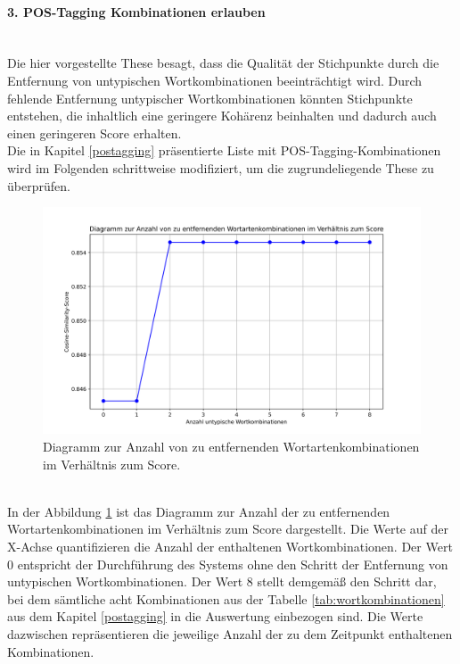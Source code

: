 \paragraph{3. POS-Tagging Kombinationen erlauben}\mbox{}\\
Die hier vorgestellte These besagt, dass die Qualität der Stichpunkte durch die Entfernung von untypischen Wortkombinationen beeinträchtigt wird. Durch fehlende Entfernung untypischer Wortkombinationen könnten Stichpunkte entstehen, die inhaltlich eine geringere Kohärenz beinhalten und dadurch auch einen geringeren Score erhalten.\\

Die in Kapitel \ref{postagging} präsentierte Liste mit POS-Tagging-Kombinationen wird im Folgenden schrittweise modifiziert, um die zugrundeliegende These zu überprüfen.
\begin{figure}[H]
	\centering  
	\includegraphics[width=\linewidth]{plot/e3-wortkombinationen-score.png}
	\caption{Diagramm zur Anzahl von zu entfernenden Wortartenkombinationen im Verhältnis zum Score.}
	\label{fig:wordcombinationvsscore}
\end{figure}\mbox{} \\
In der Abbildung \ref{fig:wordcombinationvsscore} ist das Diagramm zur Anzahl der zu entfernenden Wortartenkombinationen im Verhältnis zum Score dargestellt. Die Werte auf der X-Achse quantifizieren die Anzahl der enthaltenen Wortkombinationen. Der Wert 0 entspricht der Durchführung des Systems ohne den Schritt der Entfernung von untypischen Wortkombinationen. Der Wert 8 stellt demgemäß den Schritt dar, bei dem sämtliche acht Kombinationen aus der Tabelle \ref{tab:wortkombinationen} aus dem Kapitel \ref{postagging} in die Auswertung einbezogen sind. Die Werte dazwischen repräsentieren die jeweilige Anzahl der zu dem Zeitpunkt enthaltenen Kombinationen. 
